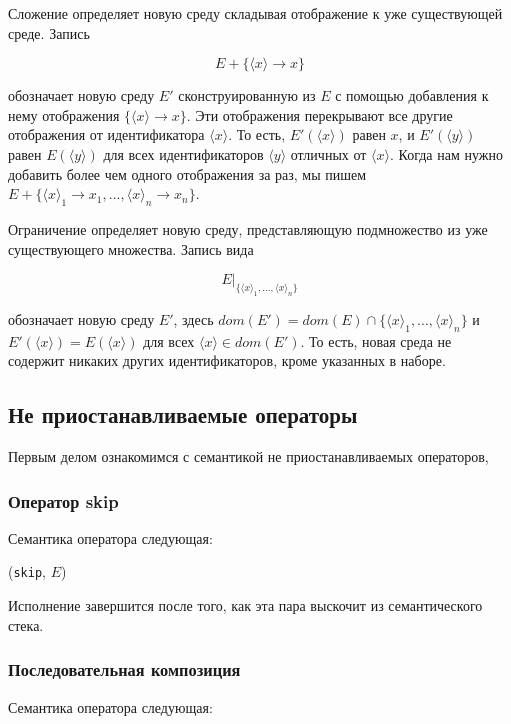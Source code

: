 Сложение определяет новую среду складывая отображение к уже существующей среде. Запись

$$E + \{ \langle x \rangle \to  x \}$$

обозначает новую среду $E'$ сконструированную из $E$ с помощью добавления к нему отображения $\{ \langle x \rangle \to x \}$. Эти отображения перекрывают все другие отображения от идентификатора $\langle x \rangle$. То есть, $E'( \langle x \rangle)$ равен $x$, и $E'( \langle y \rangle)$ равен $E( \langle y \rangle)$ для всех идентификаторов $\langle y \rangle$ отличных от $\langle x \rangle$. Когда нам нужно добавить более чем одного отображения за раз, мы пишем $E+ \{ {\langle x \rangle}_{1} \to {x}_{1}, ..., {\langle x \rangle}_{n} \to {x}_{n}\}$.

Ограничение определяет новую среду, представляющую подмножество из уже существующего множества. Запись вида

$$E|_{ \{ {\langle x \rangle}_{1} ,..., { \langle x \rangle}_{n} \}}$$

обозначает новую среду $E'$, здесь $dom(E') = dom(E) \cap  \{ { \langle x \rangle }_{1} , ..., {\langle x \rangle}_{n} \}$ и $E'(\langle x \rangle) = E(\langle x \rangle)$ для всех $\langle x \rangle \in  dom(E')$. То есть, новая среда не содержит никаких других идентификаторов, кроме указанных в наборе.

\subsection{Не приостанавливаемые операторы}\label{unstoppable_operators}

Первым делом ознакомимся с семантикой не приостанавливаемых операторов,

\subsubsection{Оператор skip}

Семантика оператора следующая:

(\lstinline|skip|, $E$)

Исполнение завершится после того, как эта пара выскочит из семантического стека.

\subsubsection{Последовательная композиция}

Семантика оператора следующая:

